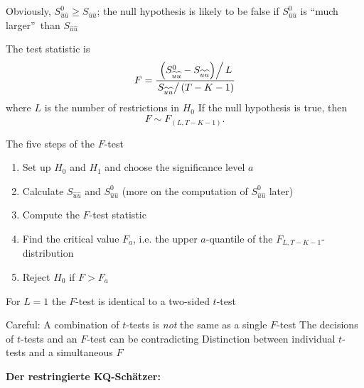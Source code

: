 \documentclass{article}
\begin{document}
Obviously, $S_{\widehat{u}\widehat{u}}^{0}\geq S_{\widehat{u}\widehat{u}}$; 
 the null hypothesis is likely to be false if $S_{\widehat{u}\widehat{u}}^0$ is \textquotedblleft much larger\textquotedblright\ than
$S_{\widehat{u}\widehat{u}}$

The test statistic is
\begin{equation*}
F=\frac{\left. \left( S_{\widehat{u}\widehat{u}}^{0}-S_{\widehat{u}
\widehat{u}}\right) \right/ L}{\left. S_{\widehat{u}\widehat{u}}\right/ \left(T-K-1\right) }
\end{equation*}
where $L$ is the number of restrictions in $H_{0}$
If the null hypothesis is true, then
\[ F\sim F_{(L,T-K-1)}. \]

The five steps of the $F$-test
\begin{enumerate}
\item Set up $H_{0}$ and $H_{1}$ and choose the significance level $a$
\item Calculate $S_{\widehat{u}\widehat{u}}$ and $S_{\widehat{u}\widehat{u}%
}^{0}$ (more on the computation of $S_{\widehat{u}\widehat{u}}^{0}$ later)
\item Compute the $F$-test statistic
\item Find the critical value $F_{a}$, i.e. the upper $a$-quantile of the $%
F_{L,T-K-1}$-distribution

\item Reject $H_{0}$ if $F>F_{a}$
\end{enumerate}
For $L=1$ the $F$-test is identical to a two-sided $t$-test

Careful: A combination of $t$-tests is \emph{not} the same as a single 
$F$-test
The decisions of $t$-tests and an $F$-test can be contradicting
Distinction between individual $t$-tests and a simultaneous $F$

\textbf{Der restringierte KQ-Schätzer:}
\end{document}
